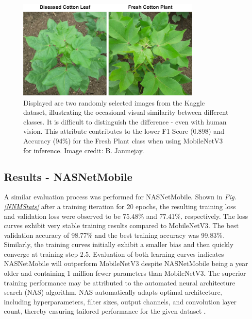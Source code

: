 \documentclass[conference]{IEEEtran}
\begin{document}
\begin{figure}[h]
\centerline{\includegraphics[height=5cm, width=1\linewidth]{Images/Disease_FreshComparison.drawio.png}}
\caption{Displayed are two randomly selected images from the Kaggle dataset, illustrating the occasional visual similarity between different classes. It is difficult to distinguish the difference - even with human vision. This attribute contributes to the lower F1-Score (0.898) and Accuracy (94\%) for the Fresh Plant class when using MobileNetV3 for inference. Image credit: B. Janmejay.}
\label{Diseased_Fresh_Plant}
\end{figure}


\subsection{Results - NASNetMobile}

A similar evaluation process was performed for NASNetMobile. Shown in \emph{Fig. \ref{NNMStats}} after a training iteration for 20 epochs, the resulting training loss and validation loss were observed to be 75.48\% and 77.41\%, respectively. The loss curves exhibit very stable training results compared to MobileNetV3. The best validation accuracy of 98.77\% and the best training accuracy was 99.83\%. Similarly, the training curves initially exhibit a smaller bias and then quickly converge at training step 2.5. Evaluation of both learning curves indicates NASNetMobile will outperform MobileNetV3 despite NASNetMobile being a year older and containing 1 million fewer parameters than MobileNetV3. The superior training performance may be attributed to the automated neural architecture search (NAS) algorithm. NAS automatically adapts optimal architecture, including hyperparameters, filter sizes, output channels, and convolution layer count, thereby ensuring tailored performance for the given dataset \cite{Yanhui}.
\end{document}

